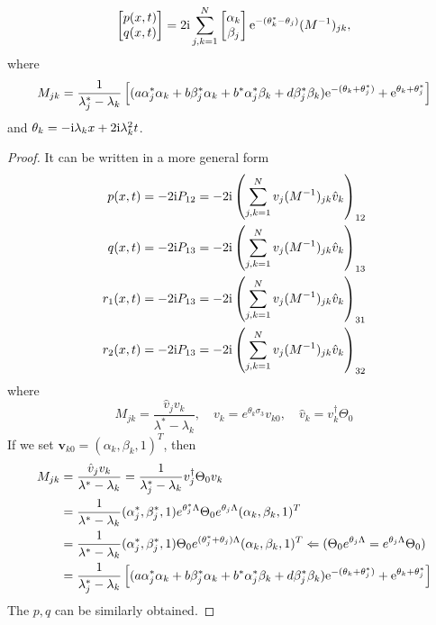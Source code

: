 \begin{equation}
    \begin{bmatrix}
        p(x,t) \\ q(x,t)
    \end{bmatrix} = 2 \mathrm{i} \sum_{j,k=1}^{N} \begin{bmatrix} \alpha_{k} \\ \beta_{j} \end{bmatrix} \mathrm{e}^{-(\theta_{k}^{*}-\theta_{j})}(M^{-1})_{jk},
\end{equation}
where 
\begin{equation}
    M_{jk} = \frac{1}{\lambda_{j}^{*}-\lambda_{k}}\left[(a \alpha_{j}^{*}\alpha_{k}+ b\beta_{j}^{*}\alpha_{k}+ b^{*}\alpha_{j}^{*}\beta_{k}+d \beta_{j}^{*}\beta_{k})\mathrm{e}^{-(\theta_{k}+\theta_{j}^{*})} + \mathrm{e}^{\theta_{k}+\theta_{j}^{*}}\right]
\end{equation}
and $\theta_{k} = - \mathrm{i} \lambda_{k} x + 2 \mathrm{i} \lambda_{k}^{2} t $. 
\begin{proof}
    It can be written in a more general form
    \begin{align}
    p(x,t) = - 2 \mathrm{i} P_{12} = - 2 \mathrm{i} \left( \sum_{j,k=1}^{N} v_{j}(M^{-1})_{jk} \hat{v}_{k}\right)_{12} \\
    q(x,t) = - 2 \mathrm{i} P_{13} = - 2 \mathrm{i} \left( \sum_{j,k=1}^{N} v_{j}(M^{-1})_{jk} \hat{v}_{k}\right)_{13} \\
    r_{1}(x,t) = - 2 \mathrm{i} P_{13} = - 2 \mathrm{i} \left( \sum_{j,k=1}^{N} v_{j}(M^{-1})_{jk} \hat{v}_{k}\right)_{31} \\
    r_{2}(x,t) = - 2 \mathrm{i} P_{13} = - 2 \mathrm{i} \left( \sum_{j,k=1}^{N} v_{j}(M^{-1})_{jk} \hat{v}_{k}\right)_{32}  
\end{align}
where 
\begin{equation}
    M_{jk} = \frac{\hat{v}_{j}v_{k}}{\lambda^{*}-\lambda_{k}}, \quad 
     v_{k} = e^{\theta_{k}\sigma_{3}}v_{k0}, \quad \hat{v}_{k} = v_{k}^{\dagger}\Theta_{0}
\end{equation} 
If we set $\mathbf{v}_{k0} = (\alpha_{k}, \beta_{k},1)^{T} $, then
\begin{equation}
    \begin{aligned}
    M_{jk} &= \frac{\hat{v}_{j}v_{k}}{\lambda^{*}-\lambda_{k}} = \frac{1}{\lambda_{j}^{*}-\lambda_{k}} v_{j}^{\dagger} \Theta_{0} v_{k} \\
    &= \frac{1}{\lambda^{*}-\lambda_{k}}  (\alpha_{j}^{*}, \beta_{j}^{*}, 1) e^{\theta_{j}^{*}\Lambda} \Theta_{0} e^{\theta_{j}\Lambda} ( \alpha_{k}, \beta_{k}, 1)^{T}\\
    &= \frac{1}{\lambda^{*}-\lambda_{k}} (\alpha_{j}^{*}, \beta_{j}^{*}, 1) \Theta_{0} e^{(\theta_{j}^{*}+\theta_{j})\Lambda} ( \alpha_{k}, \beta_{k}, 1)^{T} \Leftarrow (\Theta_{0} e^{\theta_{j}\Lambda}=e^{\theta_{j}\Lambda} \Theta_{0})\\
    &= \frac{1}{\lambda_{j}^{*}-\lambda_{k}}\left[(a \alpha_{j}^{*}\alpha_{k}+ b\beta_{j}^{*}\alpha_{k}+ b^{*}\alpha_{j}^{*}\beta_{k}+d \beta_{j}^{*}\beta_{k})\mathrm{e}^{-(\theta_{k}+\theta_{j}^{*})} + \mathrm{e}^{\theta_{k}+\theta_{j}^{*}}\right]
    \end{aligned}
\end{equation}
The $ p, q $ can be similarly obtained.
\end{proof}


